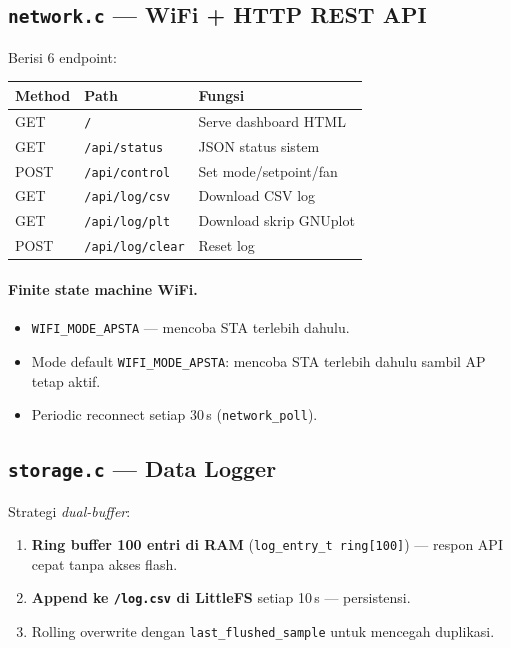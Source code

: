 \documentclass[11pt,a4paper]{article}
\begin{document}
\subsection{\texttt{network.c} --- WiFi + HTTP REST API}

Berisi 6 endpoint:
\begin{center}
\begin{tabular}{lll}
\toprule
\textbf{Method} & \textbf{Path} & \textbf{Fungsi} \\
\midrule
GET  & \texttt{/}              & Serve dashboard HTML \\
GET  & \texttt{/api/status}   & JSON status sistem \\
POST & \texttt{/api/control}  & Set mode/setpoint/fan \\
GET  & \texttt{/api/log/csv}  & Download CSV log \\
GET  & \texttt{/api/log/plt}  & Download skrip GNUplot \\
POST & \texttt{/api/log/clear} & Reset log \\
\bottomrule
\end{tabular}
\end{center}

\paragraph{Finite state machine WiFi.}
\begin{itemize}
    \item \texttt{WIFI\_MODE\_APSTA} --- mencoba STA terlebih dahulu.
    \item Mode default \texttt{WIFI\_MODE\_APSTA}: mencoba STA terlebih dahulu sambil AP tetap aktif.
    \item Periodic reconnect setiap 30\,s (\texttt{network\_poll}).
\end{itemize}

\subsection{\texttt{storage.c} --- Data Logger}

Strategi \emph{dual-buffer}:
\begin{enumerate}
    \item \textbf{Ring buffer 100 entri di RAM} (\texttt{log\_entry\_t ring[100]}) --- respon API cepat tanpa akses flash.
    \item \textbf{Append ke \texttt{/log.csv} di LittleFS} setiap 10\,s --- persistensi.
    \item Rolling overwrite dengan \texttt{last\_flushed\_sample} untuk mencegah duplikasi.
\end{enumerate}
\end{document}
